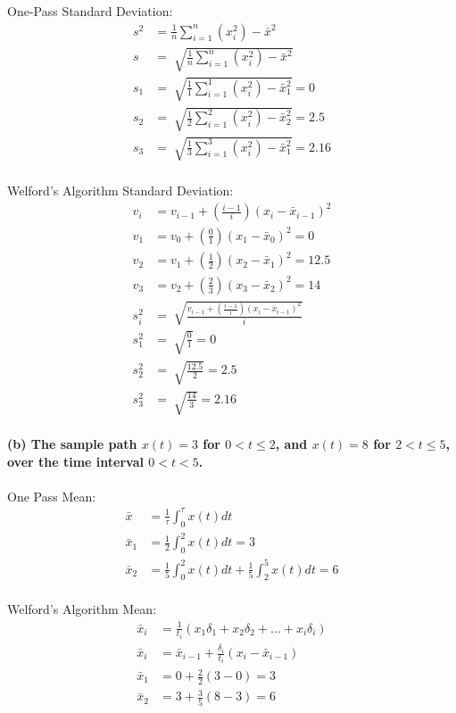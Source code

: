 One-Pass Standard Deviation: \\
\begin{align*}
    s^2&=\frac{1}{n}\sum_{i=1}^{n}(x_i^2)-\bar{x}^2\\
    s&=\sqrt[]{\frac{1}{n}\sum_{i=1}^{n}(x_i^2)-\bar{x}^2}\\
    s_1&=\sqrt[]{\frac{1}{1}\sum_{i=1}^{1}(x_i^2)-\bar{x}_1^2}=0\\
    s_2&=\sqrt[]{\frac{1}{2}\sum_{i=1}^{2}(x_i^2)-\bar{x}_2^2}=2.5\\
    s_3&=\sqrt[]{\frac{1}{3}\sum_{i=1}^{3}(x_i^2)-\bar{x}_1^2}=2.16\\
\end{align*}

\newpage
Welford's Algorithm Standard Deviation: \\
\begin{align*}
    v_i &= v_{i-1} + (\frac{i-1}{i})(x_i-\bar{x}_{i-1})^2\\
    v_1 &= v_{0} + (\frac{0}{1})(x_1-\bar{x}_{0})^2=0\\
    v_2 &= v_{1} + (\frac{1}{2})(x_2-\bar{x}_{1})^2=12.5\\
    v_3 &= v_{2} + (\frac{2}{3})(x_3-\bar{x}_{2})^2=14\\
    s_i^2 &= \sqrt[]{\frac{v_{i-1} + (\frac{i-1}{i})(x_i-\bar{x}_{i-1})^2}{i}}\\
    s_1^2 &= \sqrt[]{\frac{0}{1}}=0\\
    s_2^2 &= \sqrt[]{\frac{12.5}{2}}=2.5\\
    s_3^2 &= \sqrt[]{\frac{14}{3}}=2.16\\
\end{align*}

\noindent \textbf{(b) The sample path $x(t)=3$ for $0<t\leq 2$, and $x(t)=8$ for $2<t\leq 5$, over the time interval $0<t<5$.}\\\\

One Pass Mean: \\
\begin{align*}
    \bar{x} &= \frac{1}{\tau}\int_{0}^{\tau}x(t)dt\\
    \bar{x}_1 &= \frac{1}{2}\int_{0}^{2}x(t)dt=3\\
    \bar{x}_2 &= \frac{1}{5}\int_{0}^{2}x(t)dt + \frac{1}{5}\int_{2}^{5}x(t)dt=6\\
\end{align*}

Welford's Algorithm Mean: \\
\begin{align*}
    \bar{x}_i &= \frac{1}{t_i}(x_1\delta_1+x_2\delta_2+\ldots+x_i\delta_i)\\
    \bar{x}_i &= \bar{x}_{i-1} + \frac{\delta_i}{t_i}(x_i-\bar{x}_{i-1})\\
    \bar{x}_1 &= 0 + \frac{2}{2}(3 - 0)=3\\
    \bar{x}_2 &= 3 + \frac{3}{5}(8 - 3)=6\\
\end{align*}

